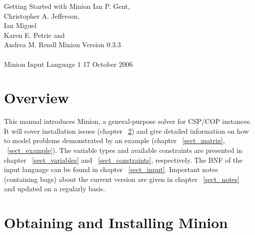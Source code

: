 \documentclass{article}
\begin{document}

\newpage

\pagestyle{empty}
\begin{center}
\vfill
{\LARGE Getting Started with {\sc Minion}}
\vfill
{\large Ian P. Gent,\\
Christopher A. Jefferson,\\
Ian Miguel\\
Karen E. Petrie and\\
Andrea M. Rendl}
\vfill
{\Large {\sc Minion} Version 0.3.3}\\
~\\
{\Large {\sc Minion} Input Language 1}
\vfill
{\large  17 October  2006}
\vfill
\end{center}

\newpage

\pagestyle{empty}
\setcounter{page}{1}
\pagestyle{plain}

\tableofcontents

\newpage
\setcounter{page}{1}
\pagestyle{headings}


\section{Overview}\label{sect_introduction}
This manual introduces {\sc Minion}, a general-purpose solver for CSP/COP instances. 
It will cover installation issues (chapter ~\ref{sect_installation})  and give detailed information on how to model problems demonstrated by an example (chapter  ~\ref{sect_matrix}, ~\ref{sect_example}). The variable types and available
constraints are presented in chapter ~\ref{sect_variables} and ~\ref{sect_constraints}, respectively. The BNF of the input language can be found in chapter ~\ref{sect_input}. Important notes (containing bugs) about the current version are given in chapter ~\ref{sect_notes} and updated on a regularly basis. 

\section{Obtaining and Installing {\sc Minion}}\label{sect_installation}
\end{document}
